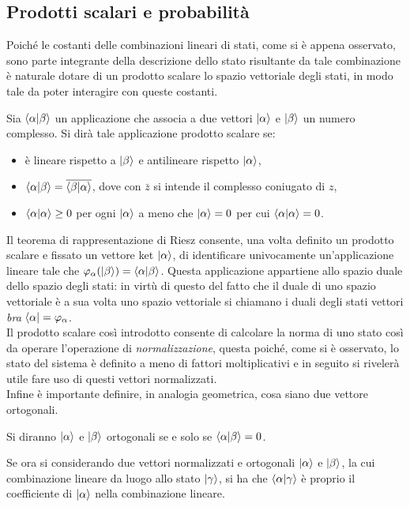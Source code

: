 \subsection{Prodotti scalari e probabilità}
Poiché le costanti delle combinazioni lineari di stati, come si è appena osservato, sono parte integrante della descrizione dello stato risultante da tale combinazione è naturale dotare di un prodotto scalare lo spazio vettoriale degli stati, in modo tale da poter interagire con queste costanti.
\begin{definition}
    Sia $\braket{\alpha |\beta}$ un applicazione che associa a due vettori $\ket{\alpha}$ e $\ket{\beta}$ un numero complesso. Si dirà tale applicazione prodotto scalare se:
    \begin{itemize}
        \item è lineare rispetto a $\ket{\beta}$ e antilineare rispetto $\ket{\alpha}$,
        \item $\braket{\alpha |\beta}=\overline{\braket{\beta |\alpha}}$, dove con $\bar z$ si intende il complesso coniugato di $z$,
        \item $\braket{\alpha |\alpha}\geq0$ per ogni $\ket{\alpha}$ a meno che $\ket{\alpha}=0$ per cui $\braket{\alpha |\alpha}=0$.
    \end{itemize} 
\end{definition}
Il teorema di rappresentazione di Riesz consente, una volta definito un prodotto scalare e fissato un vettore ket $\ket{\alpha}$, di identificare univocamente un'applicazione lineare tale che $\varphi_{\alpha}(\ket{\beta})=\braket{\alpha |\beta}$. Questa applicazione appartiene allo spazio duale dello spazio degli stati: in virtù di questo del fatto che il duale di uno spazio vettoriale è a sua volta uno spazio vettoriale si chiamano i duali degli stati vettori \emph{bra} $\bra{\alpha}=\varphi_{\alpha}$.\\
Il prodotto scalare così introdotto consente di calcolare la norma di uno stato così da operare l'operazione di \emph{normalizzazione}, questa poiché, come si è osservato, lo stato del sistema è definito a meno di fattori moltiplicativi e in seguito si rivelerà utile fare uso di questi vettori normalizzati.\\
Infine è importante definire, in analogia geometrica, cosa siano due vettore ortogonali.
\begin{definition}
    Si diranno $\ket{\alpha}$ e $\ket{\beta}$ ortogonali se e solo se $\braket{\alpha |\beta}=0$.
\end{definition}
Se ora si considerando due vettori normalizzati e ortogonali $\ket{\alpha}$ e $\ket{\beta}$, la cui combinazione lineare da luogo allo stato $\ket{\gamma}$, si ha che $\braket{\alpha|\gamma}$ è proprio il coefficiente di $\ket{\alpha}$ nella combinazione lineare.

